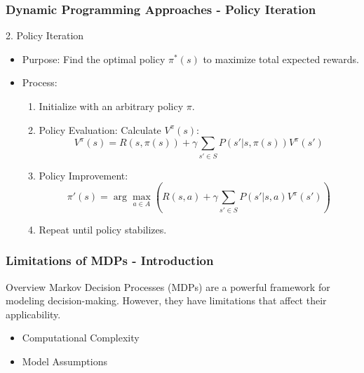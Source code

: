 \documentclass[aspectratio=169]{beamer}
\begin{document}
\begin{frame}[fragile]
    \frametitle{Dynamic Programming Approaches - Policy Iteration}
    \begin{block}{2. Policy Iteration}
        \begin{itemize}
            \item Purpose: Find the optimal policy $\pi^*(s)$ to maximize total expected rewards.
            \item Process:
            \begin{enumerate}
                \item Initialize with an arbitrary policy $\pi$.
                \item Policy Evaluation: Calculate $V^{\pi}(s)$:
                \begin{equation}
                V^{\pi}(s) = R(s, \pi(s)) + \gamma \sum_{s' \in S} P(s' | s, \pi(s)) V^{\pi}(s')
                \end{equation}
                \item Policy Improvement:
                \begin{equation}
                \pi'(s) = \arg\max_{a \in A} \left( R(s, a) + \gamma \sum_{s' \in S} P(s' | s, a) V^{\pi}(s') \right)
                \end{equation}
                \item Repeat until policy stabilizes.
            \end{enumerate}
        \end{itemize}
    \end{block}
\end{frame}

\begin{frame}[fragile]
    \frametitle{Limitations of MDPs - Introduction}
    \begin{block}{Overview}
        Markov Decision Processes (MDPs) are a powerful framework for modeling decision-making. However, they have limitations that affect their applicability.
    \end{block}

    \begin{itemize}
        \item Computational Complexity
        \item Model Assumptions
    \end{itemize}
\end{frame}
\end{document}

